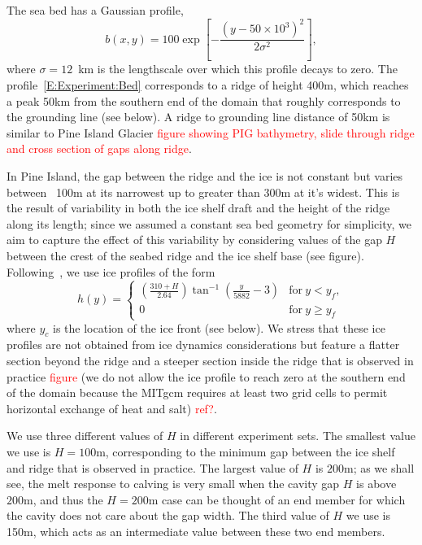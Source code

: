 \documentclass[draft]{agujournal2019}
\newcommand{\red}[1]{\textcolor{red}{#1}}
\begin{document}
The sea bed has a Gaussian profile,
\begin{equation}\label{E:Experiment:Bed}
    b(x,y) = 100 \exp\left[-\frac{\left(y - 50\times 10^3\right)^2}{2\sigma^2}\right],
\end{equation}
where $\sigma = 12$~km is the lengthscale over which this profile decays to zero. The profile~\ref{E:Experiment:Bed} corresponds to a ridge of height 400m, which reaches a peak 50km from the southern end of the domain that roughly corresponds to the grounding line (see below). A ridge to grounding line distance of 50km is similar to Pine Island Glacier \red{figure showing PIG bathymetry, slide through ridge and cross section of gaps along ridge}.

In Pine Island, the gap between the ridge and the ice is not constant but varies between ~100m at its narrowest up to greater than 300m at it's widest. This is the result of variability in both the ice shelf draft and the height of the ridge along its length; since we assumed a constant sea bed geometry for simplicity, we aim to capture the effect of this variability by considering values of the gap $H$ between the crest of the seabed ridge and the ice shelf base (see figure). Following~, we use ice profiles of the form
\begin{equation}
    h(y) = \begin{cases}
    \left(\frac{310 + H}{2.64}\right)\tan^{-1}\left(\frac{y}{5882} -3\right) & \text{for}~y < y_f,\\
    0  & \text{for}~y \geq y_f
    \end{cases}
\end{equation}
where $y_c$ is the location of the ice front (see below). We stress that these ice profiles are not obtained from ice dynamics considerations but feature a flatter section beyond the ridge and a steeper section inside the ridge that is observed in practice \red{figure} (we do not allow the ice profile to reach zero at the southern end of the domain because the MITgcm requires at least two grid cells to permit horizontal exchange of heat and salt) \red{ref?}.

We use three different values of $H$ in different experiment sets. The smallest value we use is $H = 100$m, corresponding to the minimum gap between the ice shelf and ridge that is observed in practice. The largest value of $H$ is  $200$m; as we shall see, the melt response to calving is very small when the cavity gap $H$ is above $200$m, and thus the $H = 200$m case can be thought of an end member for which the cavity does not care about the gap width. The third value of $H$ we use is 150m, which acts as an intermediate value between these two end members.
\end{document}
